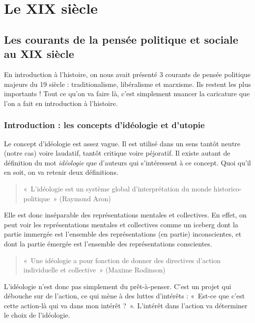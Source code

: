\documentclass[12pt]{report}
\begin{document}


\part{Le XIX siècle}

\chapter{Les courants de la  pensée politique et sociale au XIX siècle}

En introduction à l'histoire, on nous avait présenté 3 courants de pensée politique majeurs du 19 siècle : traditionalisme, libéralisme et marxisme. Ils restent les plus importants ! Tout ce qu'on va faire là, c'est simplement nuancer la caricature que l'on a fait en introduction à l'histoire.

\section*{Introduction : les concepts d'idéologie et d'utopie}

Le concept d'idéologie est assez vague. Il est utilisé dans un sens tantôt neutre (notre cas) voire laudatif, tantôt critique voire péjoratif. Il existe autant de définition du mot \emph{idéologie} que d'auteurs qui s'intéressent à ce concept. Quoi qu'il en soit, on va retenir deux définitions.

\begin{quote}
	«~L’idéologie est un système global d’interprétation du monde historico-politique~» (Raymond Aron) 
\end{quote}

Elle est donc inséparable des représentations mentales et collectives. En effet, on peut voir les représentations mentales et collectives comme un iceberg dont la partie immergée est l'ensemble des représentations (en partie) inconscientes, et dont la partie émergée est l'ensemble des représentations conscientes.

\begin{quote}
«~Une idéologie a pour fonction de donner des directives d’action individuelle et collective~» (Maxime Rodinson)
\end{quote}

L'idéologie n'est donc pas simplement du prêt-à-penser. C'est un projet qui débouche sur de l'action, ce qui mène à des luttes d'intérêts : «~Est-ce que c'est cette action-là qui va dans mon intérêt ?~». L'intérêt dans l'action va déterminer le choix de l'idéologie.
\end{document}
